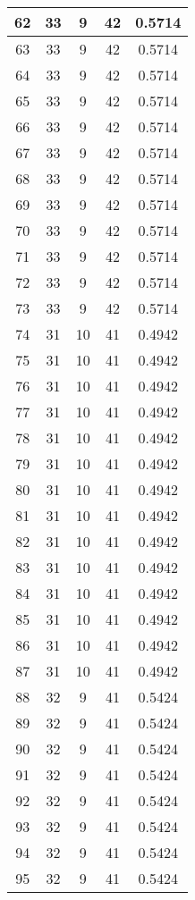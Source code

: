 \documentclass[letterpaper, 12pt]{article}
\begin{document}
\begin{longtable}{|c|c|c|c|c|}
\hline
62 & 33 & 9 & 42 & 0.5714 \\
\hline
63 & 33 & 9 & 42 & 0.5714 \\
\hline
64 & 33 & 9 & 42 & 0.5714 \\
\hline
65 & 33 & 9 & 42 & 0.5714 \\
\hline
66 & 33 & 9 & 42 & 0.5714 \\
\hline
67 & 33 & 9 & 42 & 0.5714 \\
\hline
68 & 33 & 9 & 42 & 0.5714 \\
\hline
69 & 33 & 9 & 42 & 0.5714 \\
\hline
70 & 33 & 9 & 42 & 0.5714 \\
\hline
71 & 33 & 9 & 42 & 0.5714 \\
\hline
72 & 33 & 9 & 42 & 0.5714 \\
\hline
73 & 33 & 9 & 42 & 0.5714 \\
\hline
74 & 31 & 10 & 41 & 0.4942 \\
\hline
75 & 31 & 10 & 41 & 0.4942 \\
\hline
76 & 31 & 10 & 41 & 0.4942 \\
\hline
77 & 31 & 10 & 41 & 0.4942 \\
\hline
78 & 31 & 10 & 41 & 0.4942 \\
\hline
79 & 31 & 10 & 41 & 0.4942 \\
\hline
80 & 31 & 10 & 41 & 0.4942 \\
\hline
81 & 31 & 10 & 41 & 0.4942 \\
\hline
82 & 31 & 10 & 41 & 0.4942 \\
\hline
83 & 31 & 10 & 41 & 0.4942 \\
\hline
84 & 31 & 10 & 41 & 0.4942 \\
\hline
85 & 31 & 10 & 41 & 0.4942 \\
\hline
86 & 31 & 10 & 41 & 0.4942 \\
\hline
87 & 31 & 10 & 41 & 0.4942 \\
\hline
88 & 32 & 9 & 41 & 0.5424 \\
\hline
89 & 32 & 9 & 41 & 0.5424 \\
\hline
90 & 32 & 9 & 41 & 0.5424 \\
\hline
91 & 32 & 9 & 41 & 0.5424 \\
\hline
92 & 32 & 9 & 41 & 0.5424 \\
\hline
93 & 32 & 9 & 41 & 0.5424 \\
\hline
94 & 32 & 9 & 41 & 0.5424 \\
\hline
95 & 32 & 9 & 41 & 0.5424 \\
\hline

\end{longtable}
\end{document}
